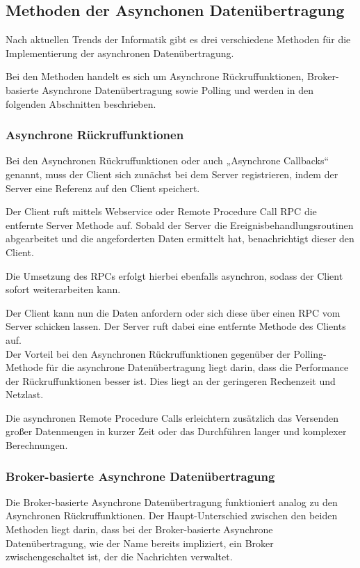 \subsection{Methoden der Asynchonen Datenübertragung}
Nach aktuellen Trends der Informatik gibt es drei verschiedene Methoden für die Implementierung der asynchronen Datenübertragung. 

Bei den Methoden handelt es sich um Asynchrone Rückruffunktionen, Broker-basierte Asynchrone Datenübertragung sowie Polling und werden in den folgenden Abschnitten beschrieben. 

\subsubsection{Asynchrone Rückruffunktionen}
Bei den Asynchronen Rückruffunktionen oder auch „Asynchrone Callbacks“ genannt, muss der Client sich zunächst bei dem Server registrieren, indem der Server eine Referenz auf den Client speichert. \cite{abts:2019}

Der Client ruft mittels Webservice oder Remote Procedure Call \ac{RPC} die entfernte Server Methode auf. Sobald der Server die Ereignisbehandlungsroutinen abgearbeitet und die angeforderten Daten ermittelt hat, benachrichtigt dieser den Client. \cite*{bengelbaun:2015}

Die Umsetzung des RPCs erfolgt hierbei ebenfalls asynchron, sodass der Client sofort weiterarbeiten kann. \cite*{schill:2012}

Der Client kann nun die Daten anfordern oder sich diese über einen RPC vom Server schicken lassen. Der Server ruft dabei eine entfernte Methode des Clients auf. \cite*{abts:2019,schill:2012}  \\

Der Vorteil bei den Asynchronen Rückruffunktionen gegenüber der Polling-Methode für die asynchrone Datenübertragung liegt darin, dass die Performance der Rückruffunktionen besser ist. Dies liegt an der geringeren Rechenzeit und Netzlast. \cite*{abts:2019}

Die asynchronen Remote Procedure Calls erleichtern zusätzlich das Versenden großer Datenmengen in kurzer Zeit oder das Durchführen langer und komplexer Berechnungen. \cite*{schill:2012}

\subsubsection{Broker-basierte Asynchrone Datenübertragung}
Die Broker-basierte Asynchrone Datenübertragung funktioniert analog zu den Asynchronen Rückruffunktionen. Der Haupt-Unterschied zwischen den beiden Methoden liegt darin, dass bei der Broker-basierte Asynchrone Datenübertragung, wie der Name bereits impliziert, ein Broker zwischengeschaltet ist, der die Nachrichten verwaltet. 

